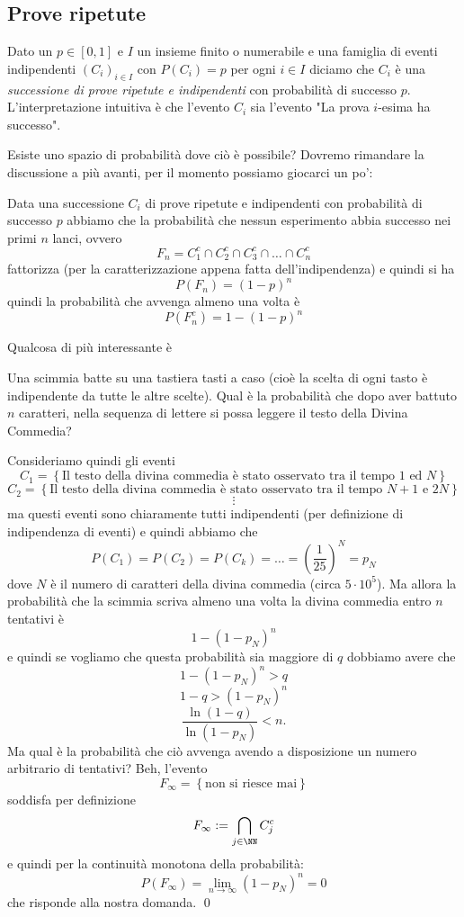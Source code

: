 \documentclass[11pt]{scrartcl}
\begin{document}
	\subsection{Prove ripetute}
	\begin{definition}
		Dato un $p\in [0,1]$ e $I$ un insieme finito o numerabile e una famiglia di eventi indipendenti $(C_i)_{i\in I}$ con $P(C_i)=p$ per ogni $i\in I$ diciamo che $C_i$ è una \textit{successione di prove ripetute e indipendenti} con probabilità di successo $p$. L'interpretazione intuitiva è che l'evento $C_i$ sia l'evento "La prova $i$-esima ha successo".
	\end{definition}
	Esiste uno spazio di probabilità dove ciò è possibile? Dovremo rimandare la discussione a più avanti, per il momento possiamo giocarci un po':
	\begin{example}
		Data una successione $C_i$ di prove ripetute e indipendenti con probabilità di successo $p$ abbiamo che la probabilità che nessun esperimento abbia successo nei primi $n$ lanci, ovvero
		$$F_n=C_1^c\cap C_2^c \cap C_3^c\cap\dots \cap C_n^c$$
		fattorizza (per la caratterizzazione appena fatta dell'indipendenza) e quindi si ha
		$$P(F_n)=(1-p)^n$$
		quindi la probabilità che avvenga almeno una volta è
		$$P(F_n^c)=1-(1-p)^n$$
	\end{example}
	Qualcosa di più interessante è
	\begin{example}
		Una scimmia batte su una tastiera tasti a caso (cioè la scelta di ogni tasto è indipendente da tutte le altre scelte). Qual è la probabilità che dopo aver battuto $n$ caratteri, nella sequenza di lettere si possa leggere il testo della Divina Commedia?
	\end{example}
	\begin{answer}
		Consideriamo quindi gli eventi 
		$$C_1=\left\{\text{Il testo della divina commedia è stato osservato tra il tempo $1$ ed $N$}\right\}$$
		$$C_2=\left\{\text{Il testo della divina commedia è stato osservato tra il tempo $N+1$ e $2N$}\right\}$$
		$$\vdots$$
		ma questi eventi sono chiaramente tutti indipendenti (per definizione di indipendenza di eventi) e quindi abbiamo che 
		$$P(C_1)=P(C_2)=P(C_k)=\dots=\left(\frac{1}{25}\right)^N=p_N$$
		dove $N$ è il numero di caratteri della divina commedia (circa $5\cdot 10^5$). Ma allora la probabilità che la scimmia scriva almeno una volta la divina commedia entro $n$ tentativi è 
		$$1-(1-p_N)^n$$
		e quindi se vogliamo che questa probabilità sia maggiore di $q$ dobbiamo avere che
		$$1-(1-p_N)^n>q$$
		$$1-q>(1-p_N)^n$$
		$$\frac{\ln (1-q)}{\ln (1-p_N)}<n.$$
		Ma qual è la probabilità che ciò avvenga avendo a disposizione un numero arbitrario di tentativi? Beh, l'evento 
		$$F_\infty=\left\{\text{non si riesce mai}\right\}$$
		soddisfa per definizione
		$$F_\infty:=\bigcap_{j\in \NN}C^c_j$$
		e quindi per la continuità monotona della probabilità:
		$$P(F_\infty)=\lim_{n\to\infty}(1-p_N)^n=0$$
		che risponde alla nostra domanda. \qed
	\end{answer}
\end{document}
